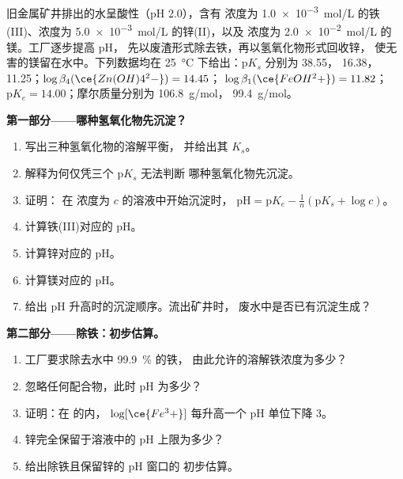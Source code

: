 \begin{problem}
\label{pb:b1:precipitation:1}
旧金属矿井排出的水呈酸性（pH 2.0），含有
浓度为 \qty{1.0e-3}{mol/L} 的铁(III)、浓度为 \qty{5.0e-3}{mol/L} 的锌(II)，以及
浓度为 \qty{2.0e-2}{mol/L} 的镁。工厂逐步提高 pH，
先以废渣形式除去铁，再以氢氧化物形式回收锌，
使无害的镁留在水中。下列数据均在
\qty{25}{\celsius} 下给出：$\mathrm{p}K_s$ 分别为  38.55，
16.38， 11.25；$\log\beta_4(\ce{Zn(OH)4^2-}) = 14.45$；
$\log\beta_1(\ce{FeOH^2+}) = 11.82$；$\mathrm{p}K_e = 14.00$；摩尔质量分别为
 \qty{106.8}{g/mol}， \qty{99.4}{g/mol}。

\medskip
\noindent\textbf{第一部分——哪种氢氧化物先沉淀？}
\begin{enumerate}
  \item 写出三种氢氧化物的溶解平衡，
        并给出其 $K_s$。
  \item 解释为何仅凭三个 $\mathrm{p}K_s$ 无法判断
        哪种氢氧化物先沉淀。
  \item 证明： 在  浓度为 $c$ 的溶液中开始沉淀时，
        $\mathrm{pH} = \mathrm{p}K_e -
        \frac1n(\mathrm{p}K_s + \log c)$。
  \item 计算铁(III)对应的 pH。
  \item 计算锌对应的 pH。
  \item 计算镁对应的 pH。
  \item 给出 pH 升高时的沉淀顺序。流出矿井时，
        废水中是否已有沉淀生成？
\end{enumerate}

\medskip
\noindent\textbf{第二部分——除铁：初步估算。}
\begin{enumerate}[resume]
  \item 工厂要求除去水中 \qty{99.9}{\percent} 的铁，
        由此允许的溶解铁浓度为多少？
  \item 忽略任何配合物，此时 pH 为多少？
  \item 证明：在  的内，
        $\log[\ce{Fe^3+}]$ 每升高一个 pH 单位下降 3。
  \item 锌完全保留于溶液中的 pH 上限为多少？
  \item 给出除铁且保留锌的 pH 窗口的
        初步估算。
\end{enumerate}


\end{problem}
